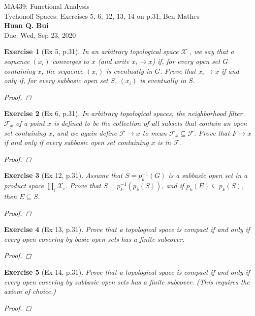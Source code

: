 \documentclass[11pt]{article}
\newtheorem{exercise}{Exercise}
\newcommand{\F}{\mathcal{F}}
\newcommand{\X}{\mathcal{X}}
\begin{document}
\begin{center}
\begin{framed}
{\Large  MA439: Functional Analysis\\
	 Tychonoff Spaces:  Exercises 5, 6, 12, 13, 14 on p.31, Ben Mathes}\\
$\,$\\
{\Large \bf  Huan Q. Bui\\}
$\,$\\
{\Large Due: Wed, Sep 23, 2020}
\end{framed}
\end{center}

\begin{exercise}[Ex 5, p.31]
	In an arbitrary topological space $\X$ , we say that a sequence $(x_i)$ converges to $x$ (and write $x_i \to x$) if, for every open set $G$ containing $x$, the sequence
	$(x_i)$ is eventually in $G$. Prove that $x_i \to x$ if and only if, for every subbasic open set $S$, $(x_i)$ is eventually in $S$.
	\begin{proof}
		
	\end{proof}
\end{exercise}

\begin{exercise}[Ex 6, p.31]
	In arbitrary topological spaces, the neighborhood filter $\F_x$ of a point $x$ is
	defined to be the collection of all subsets that contain an open set containing
	$x$, and we again define $\F \to x$ to mean $\F_x \subseteq \F$. Prove that $F \to x$ if and only if every subbasic open set containing $x$ is in $\F$.

	\begin{proof}
		
	\end{proof}
\end{exercise}

\begin{exercise}[Ex 12, p.31]
	Assume that $S = p^{−1}_k(G)$ is a subbasic open set in a product space $\prod_i \X_i$. Prove that $S = p^{−1}_k(p_k(S))$, and if $p_k(E) \subseteq p_k(S)$, then $E \subseteq S$.
	\begin{proof}
		
	\end{proof}
\end{exercise}

\begin{exercise}[Ex 13, p.31]
	Prove that a topological space is compact if and only if every open covering
	by basic open sets has a finite subcover.
	\begin{proof}
		
	\end{proof}
\end{exercise}

\begin{exercise}[Ex 14, p.31]
	Prove that a topological space is compact if and only if every open covering
	by subbasic open sets has a finite subcover. (This requires the axiom of
	choice.)

	\begin{proof}
		
	\end{proof}
\end{exercise}
\end{document}

